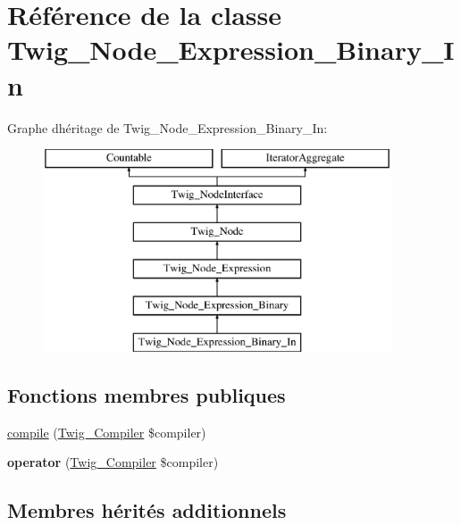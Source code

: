 \hypertarget{class_twig___node___expression___binary___in}{}\section{Référence de la classe Twig\+\_\+\+Node\+\_\+\+Expression\+\_\+\+Binary\+\_\+\+In}
\label{class_twig___node___expression___binary___in}
Graphe d\textquotesingle{}héritage de Twig\+\_\+\+Node\+\_\+\+Expression\+\_\+\+Binary\+\_\+\+In\+:\begin{figure}[H]
\begin{center}
\leavevmode
\includegraphics[height=6.000000cm]{class_twig___node___expression___binary___in}
\end{center}
\end{figure}
\subsection*{Fonctions membres publiques}
\begin{DoxyCompactItemize}
\item 
\hyperlink{class_twig___node___expression___binary___in_a4e0faa87c3fae583620b84d3607085da}{compile} (\hyperlink{class_twig___compiler}{Twig\+\_\+\+Compiler} \$compiler)
\item 
{\bfseries operator} (\hyperlink{class_twig___compiler}{Twig\+\_\+\+Compiler} \$compiler)\hypertarget{class_twig___node___expression___binary___in_af77318ec88d5f8a508684970a150b670}{}\label{class_twig___node___expression___binary___in_af77318ec88d5f8a508684970a150b670}

\end{DoxyCompactItemize}
\subsection*{Membres hérités additionnels}


